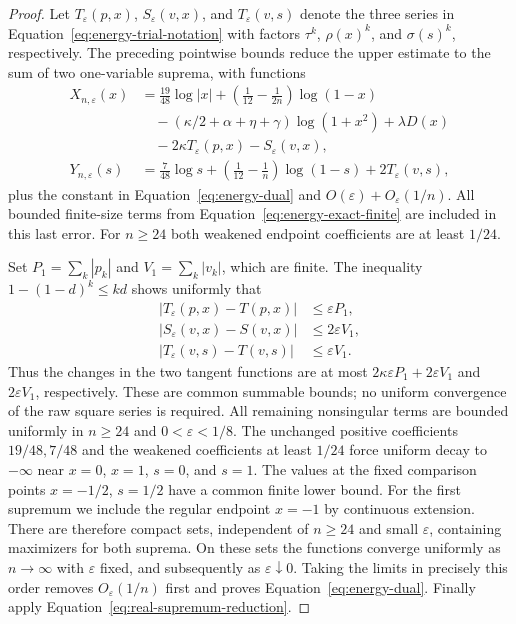 \begin{proof}
Let $T_\varepsilon(p,x)$, $S_\varepsilon(v,x)$, and
$T_\varepsilon(v,s)$ denote the three series in
Equation~\eqref{eq:energy-trial-notation} with factors
$\tau^k$, $\rho(x)^k$, and $\sigma(s)^k$, respectively.
The preceding pointwise bounds reduce the upper estimate to the sum of
two one-variable suprema, with functions
\begin{align*}
 X_{n,\varepsilon}(x)
 &=\frac{19}{48}\log|x|
   +\left(\frac1{12}-\frac1{2n}\right)\log(1-x)
   \\
 &\quad-(\kappa/2+\alpha+\eta+\gamma)\log(1+x^2)
   +\lambda D(x)\\
 &\quad-2\kappa T_\varepsilon(p,x)-S_\varepsilon(v,x),\\
 Y_{n,\varepsilon}(s)
 &=\frac7{48}\log s
   +\left(\frac1{12}-\frac1n\right)\log(1-s)
   +2T_\varepsilon(v,s),
\end{align*}
plus the constant in Equation~\eqref{eq:energy-dual} and
$O(\varepsilon)+O_\varepsilon(1/n)$.  All bounded finite-size terms from
Equation~\eqref{eq:energy-exact-finite} are included in this last error.
For $n\ge24$ both weakened endpoint coefficients are at least $1/24$.

Set $P_1=\sum_k|p_k|$ and $V_1=\sum_k|v_k|$, which are finite.
The inequality $1-(1-d)^k\le kd$ shows uniformly that
\begin{align*}
 |T_\varepsilon(p,x)-T(p,x)|&\le\varepsilon P_1,\\
 |S_\varepsilon(v,x)-S(v,x)|&\le2\varepsilon V_1,\\
 |T_\varepsilon(v,s)-T(v,s)|&\le\varepsilon V_1.
\end{align*}
Thus the changes in the two tangent functions are at most
$2\kappa\varepsilon P_1+2\varepsilon V_1$ and
$2\varepsilon V_1$, respectively.  These are common summable bounds;
no uniform convergence of the raw square series is required.
All remaining nonsingular terms are bounded uniformly in $n\ge24$ and
$0<\varepsilon<1/8$.  The unchanged positive coefficients $19/48,7/48$
and the weakened coefficients at least $1/24$ force uniform decay to
$-\infty$ near $x=0$, $x=1$, $s=0$, and $s=1$.
The values at the fixed comparison points $x=-1/2$, $s=1/2$ have a
common finite lower bound. For the first supremum we include the
regular endpoint $x=-1$ by continuous extension.
There are therefore compact sets, independent
of $n\ge24$ and small $\varepsilon$, containing maximizers for both
suprema. On these sets the functions converge uniformly as $n\to\infty$
with $\varepsilon$ fixed, and subsequently as $\varepsilon\downarrow0$.
Taking the limits in precisely this order removes
$O_\varepsilon(1/n)$ first and proves Equation~\eqref{eq:energy-dual}.
Finally apply Equation~\eqref{eq:real-supremum-reduction}.
\end{proof}
